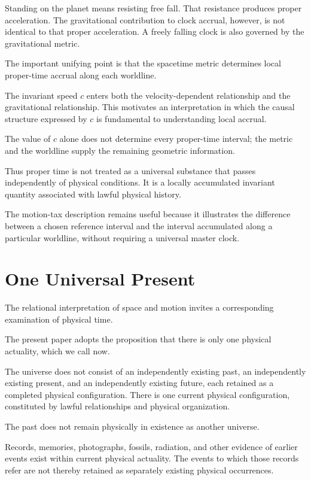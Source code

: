\documentclass[12pt,onecolumn]{article}
\begin{document}
Standing on the planet means resisting free fall. That resistance produces proper acceleration. The gravitational contribution to clock accrual, however, is not identical to that proper acceleration. A freely falling clock is also governed by the gravitational metric.

The important unifying point is that the spacetime metric determines local proper-time accrual along each worldline.

The invariant speed \(c\) enters both the velocity-dependent relationship and the gravitational relationship. This motivates an interpretation in which the causal structure expressed by \(c\) is fundamental to understanding local accrual.

The value of \(c\) alone does not determine every proper-time interval; the metric and the worldline supply the remaining geometric information.

Thus proper time is not treated as a universal substance that passes independently of physical conditions. It is a locally accumulated invariant quantity associated with lawful physical history.

The motion-tax description remains useful because it illustrates the difference between a chosen reference interval and the interval accumulated along a particular worldline, without requiring a universal master clock.

\section{One Universal Present}

The relational interpretation of space and motion invites a corresponding examination of physical time.

The present paper adopts the proposition that there is only one physical actuality, which we call now.

The universe does not consist of an independently existing past, an independently existing present, and an independently existing future, each retained as a completed physical configuration. There is one current physical configuration, constituted by lawful relationships and physical organization.

The past does not remain physically in existence as another universe.

Records, memories, photographs, fossils, radiation, and other evidence of earlier events exist within current physical actuality. The events to which those records refer are not thereby retained as separately existing physical occurrences.
\end{document}
